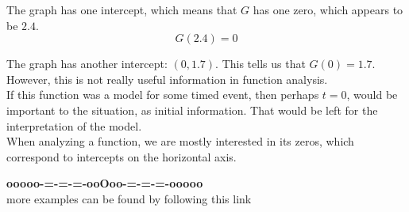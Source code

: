 \documentclass{ximera}
\begin{document}
The graph has one intercept, which means that $G$ has one zero, which appears to be $2.4$. \\

\[  G(2.4) = 0  \]




The graph has another intercept: $(0, 1.7)$. This tells us that $G(0)=1.7$.  However, this is not really useful information in function analysis. \\


If this function was a model for some timed event, then perhaps $t = 0$, would be important to the situation, as initial information.  That would be left for the interpretation of the model. \\

When analyzing a function, we are mostly interested in its zeros, which correspond to intercepts on the horizontal axis.






















\begin{center}
\textbf{\textcolor{green!50!black}{ooooo-=-=-=-ooOoo-=-=-=-ooooo}} \\

more examples can be found by following this link\\ 

\end{center}
\end{document}
